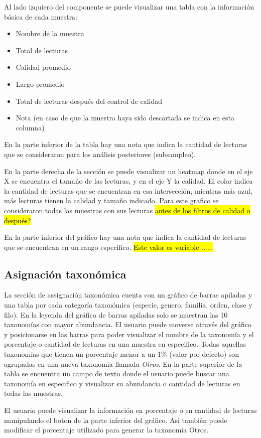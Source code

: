 Al lado izquiero del componente se puede visualizar una tabla con la información básica de cada muestra:
\begin{itemize}
    \item Nombre de la muestra
    \item Total de lecturas
    \item Calidad promedio
    \item Largo promedio
    \item Total de lecturas después del control de calidad
    \item Nota (en caso de que la muestra haya sido descartada se indica en esta columna)
\end{itemize}
En la parte inferior de la tabla hay una nota que indica la cantidad de lecturas que se consideraron para los análisis posteriores (subsampleo).

En la parte derecha de la sección se puede visualizar un heatmap donde en el eje X se encuentra el tamaño de las lecturas, y en el eje Y la calidad. El color indica la cantidad de lecturas que se encuentran en esa intersección, mientras más azul, más lecturas tienen la calidad y tamaño indicado.
Para este grafico se consideraron todas las muestras con sus lecturas \hl{antes de los filtros de calidad o después?}.

En la parte inferior del gráfico hay una nota que indica la cantidad de lecturas que se encuentran en un rango especifico. \hl{Este valor es variable ......}
\subsection{Asignación taxonómica}
La sección de assignación taxonómica cuenta con un gráfico de barras apiladas y una tabla por cada categoría taxonómica (especie, genero,  familia, orden, clase y filo).
En la leyenda del gráfico de barras apiladas solo se muestran las 10 taxonomías con mayor abundancia. El usuario puede moverse através del gráfico y posicionarse en las barras para poder visualizar el nombre de la taxonomía y el porcentaje o cantidad de lecturas en una muestra en especifico. Todas aquellas taxonomías que tienen un porcentaje menor a un 1\% (valor por defecto) son agrupadas en una nueva taxonomia llamada \textit{Otros}.
En la parte superior de la tabla se encuentra un campo de texto donde el usuario puede buscar una taxonomía en especifico y visualizar su abundancia o cantidad de lecturas en todas las muestras.

El usuario puede visualizar la información en porcentaje o en cantidad de lecturas manipulando el boton de la parte inferior del gráfico. Asi también puede modificar el porcentaje utilizado para generar la taxonomía Otros.


